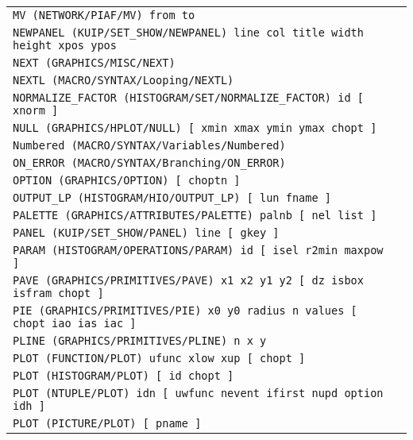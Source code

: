 \begin{longtable}{|>{\footnotesize\tt}lr|}
MV (NETWORK/PIAF/MV)  from to & \pageref{ref:NETWORK/PIAF/MV}\\ 
NEWPANEL (KUIP/SET_SHOW/NEWPANEL)  line col title width height xpos ypos & \pageref{ref:KUIP/SET_SHOW/NEWPANEL}\\ 
NEXT (GRAPHICS/MISC/NEXT)  & \pageref{ref:GRAPHICS/MISC/NEXT}\\ 
NEXTL (MACRO/SYNTAX/Looping/NEXTL)  & \pageref{ref:MACRO/SYNTAX/Looping/NEXTL}\\ 
NORMALIZE_FACTOR (HISTOGRAM/SET/NORMALIZE_FACTOR)  id [ xnorm ] & \pageref{ref:HISTOGRAM/SET/NORMALIZE_FACTOR}\\ 
NULL (GRAPHICS/HPLOT/NULL)  [ xmin xmax ymin ymax chopt ] & \pageref{ref:GRAPHICS/HPLOT/NULL}\\ 
Numbered (MACRO/SYNTAX/Variables/Numbered)  & \pageref{ref:MACRO/SYNTAX/Variables/Numbered}\\ 
ON_ERROR (MACRO/SYNTAX/Branching/ON_ERROR)  & \pageref{ref:MACRO/SYNTAX/Branching/ON_ERROR}\\ 
OPTION (GRAPHICS/OPTION)  [ choptn ] & \pageref{ref:GRAPHICS/OPTION}\\ 
OUTPUT_LP (HISTOGRAM/HIO/OUTPUT_LP)  [ lun fname ] & \pageref{ref:HISTOGRAM/HIO/OUTPUT_LP}\\ 
PALETTE (GRAPHICS/ATTRIBUTES/PALETTE)  palnb [ nel list ] & \pageref{ref:GRAPHICS/ATTRIBUTES/PALETTE}\\ 
PANEL (KUIP/SET_SHOW/PANEL)  line [ gkey ] & \pageref{ref:KUIP/SET_SHOW/PANEL}\\ 
PARAM (HISTOGRAM/OPERATIONS/PARAM)  id [ isel r2min maxpow ] & \pageref{ref:HISTOGRAM/OPERATIONS/PARAM}\\ 
PAVE (GRAPHICS/PRIMITIVES/PAVE)  x1 x2 y1 y2 [ dz isbox isfram chopt ] & \pageref{ref:GRAPHICS/PRIMITIVES/PAVE}\\ 
PIE (GRAPHICS/PRIMITIVES/PIE)  x0 y0 radius n values [ chopt iao ias iac ] & \pageref{ref:GRAPHICS/PRIMITIVES/PIE}\\ 
PLINE (GRAPHICS/PRIMITIVES/PLINE)  n x y & \pageref{ref:GRAPHICS/PRIMITIVES/PLINE}\\ 
PLOT (FUNCTION/PLOT)  ufunc xlow xup [ chopt ] & \pageref{ref:FUNCTION/PLOT}\\ 
PLOT (HISTOGRAM/PLOT)  [ id chopt ] & \pageref{ref:HISTOGRAM/PLOT}\\ 
PLOT (NTUPLE/PLOT)  idn [ uwfunc nevent ifirst nupd option idh ] & \pageref{ref:NTUPLE/PLOT}\\ 
PLOT (PICTURE/PLOT)  [ pname ] & \pageref{ref:PICTURE/PLOT}\\ 

\end{longtable}
